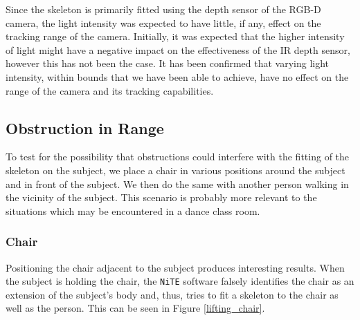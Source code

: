 \documentclass[10pt,a4paper]{article}
\begin{document}
\noindent
Since the skeleton is primarily fitted using the depth sensor of the RGB-D camera, the light intensity was expected to have little, if any, effect on the tracking range of the camera. Initially, it was expected that the higher intensity of light might have a negative impact on the effectiveness of the IR depth sensor, however this has not been the case. It has been confirmed that varying light intensity, within bounds that we have been able to achieve, have no effect on the range of the camera and its tracking capabilities.

\subsection{Obstruction in Range}
\noindent
To test for the possibility that obstructions could interfere with the fitting of the skeleton on the subject, we place a chair in various positions around the subject and in front of the subject. We then do the same with another person walking in the vicinity of the subject. This scenario is probably more relevant to the situations which may be encountered in a dance class room.  
\subsubsection{Chair}
\noindent Positioning the chair adjacent to the subject produces interesting results. When the subject is holding the chair, the \texttt{NiTE} software falsely identifies the chair as an extension of the subject's body and, thus, tries to fit a skeleton to the chair as well as the person. This can be seen in Figure \ref{lifting_chair}.
\end{document}
